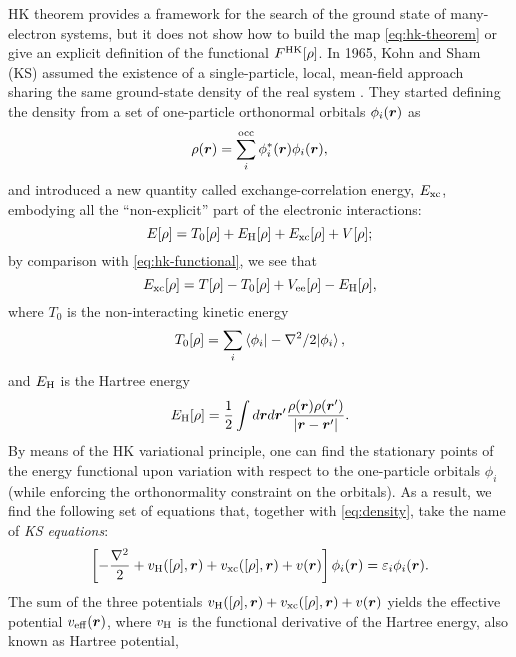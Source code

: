 HK theorem provides a framework for the search of the ground state of many-electron systems, but it does not show how to build the map \eqref{eq:hk-theorem} or give an explicit definition of the functional $F^{\rm HK}[\rho]$. In 1965, Kohn and Sham (KS) assumed the existence of a single-particle, local, mean-field approach sharing the same ground-state density of the real system \cite{kohn_self-consistent_1965}. They started defining the density from a set of one-particle orthonormal orbitals $\phi_i({\bm r})$ as
%
\begin{equation}
    \rho({\bm r}) = \sum_i^{\rm occ} \phi^*_i({\bm r}) \phi_i({\bm r}) ,
    \label{eq:density}
\end{equation}
%
and introduced a new quantity called exchange-correlation energy, $E_{\rm xc}$, embodying all the ``non-explicit'' part of the electronic interactions:
%
\begin{equation}
    E[\rho] = T_0[\rho] + E_{\rm H}[\rho] + E_{\rm xc}[\rho] + V[\rho] ;
    \label{eq:energy-functional}
\end{equation}
%
by comparison with \cref{eq:hk-functional}, we see that
%
\begin{equation}
    E_{\rm xc}[\rho] = T[\rho] - T_0[\rho] + V_{\rm ee}[\rho] - E_{\rm H}[\rho] ,
    \label{eq:xc-energy}
\end{equation}
%
where $T_0$ is the non-interacting kinetic energy
%
\begin{equation}
    T_0[\rho] = \sum_i \braket{\phi_i | -\nabla^2/2 | \phi_i} ,
    \label{eq:non-int-kinetic}
\end{equation}
%
and $E_{\rm H}$ is the Hartree energy
\begin{equation}
    E_{\rm H}[\rho] = \frac{1}{2} \int d{\bm r} d{\bm r}' \frac{\rho({\bm r})\rho({\bm r}')}{|{\bm r}-{\bm r}'|} .
    \label{eq:hartree-energy}
\end{equation}
%
By means of the HK variational principle, one can find the stationary points of the energy functional upon variation with respect to the one-particle orbitals $\phi_i$ (while enforcing the orthonormality constraint on the orbitals). As a result, we find the following set of equations that, together with \cref{eq:density}, take the name of \emph{KS equations}:
%
\begin{equation}
    \left[ - \frac{\nabla^2}{2} + v_{\rm H}([\rho],{\bm r}) + v_{\rm xc}([\rho],{\bm r}) + v({\bm r}) \right] \phi_i({\bm r}) = \varepsilon_i \phi_i({\bm r}) .
    \label{eq:ks-equations}
\end{equation}
%
The sum of the three potentials $v_{\rm H}([\rho],{\bm r}) + v_{\rm xc}([\rho],{\bm r}) + v({\bm r})$ yields the effective potential $v_{\rm eff}({\bm r})$, where $v_{\rm H}$ is the functional derivative of the Hartree energy, also known as Hartree potential,
